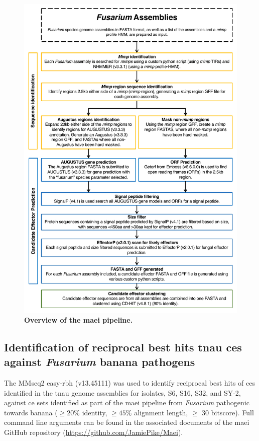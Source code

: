 \begin{figure}[htp!]
    \centering
    \includegraphics[width=14cm]{Figures/Maie_v5_Figure.pdf}
    \caption[Overview of the \acf{maei} pipeline.]{\textbf{Overview of the \acf{maei} pipeline.}}  
    \label{fig:MaeiPipeline}
\end{figure}

\subsection{Identification of reciprocal best hits \acl{tnau} \aclp{ce} against \textit{Fusarium} banana pathogens}

The MMseq2 easy-rbh (v13.45111) \parencite{Steinegger2017} was used to identify reciprocal best hits of \acp{ce} identified in the \ac{tnau} genome assemblies for isolates, S6, S16, S32, and SY-2, against \ac{ce} sets identified as part of the \ac{maei} pipeline from \textit{Fusarium} pathogenic towards banana ($\geq 20\%$ identity, $\geq 45\%$ alignment length, $\geq$ 30 bitscore). Full command line arguments can be found in the associated documents of the \ac{maei} GitHub repository (\href{https://github.com/JamiePike/Maei}{https://github.com/JamiePike/Maei}).   

